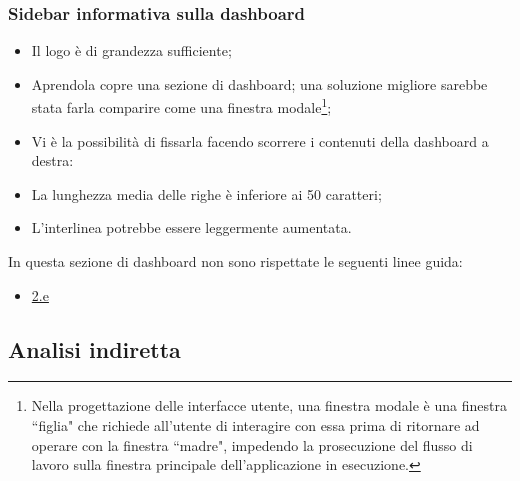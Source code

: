 \subsubsection{Sidebar informativa sulla dashboard}
\label{sss:sidebar-informativa-dashboard}
\begin{itemize}
    \item Il logo è di grandezza sufficiente;
    \item Aprendola copre una sezione di dashboard; una soluzione migliore sarebbe stata farla comparire come una finestra modale\footnote{Nella progettazione delle interfacce utente, una finestra modale è una finestra ``figlia" che richiede all'utente di interagire con essa prima di ritornare ad operare con la finestra ``madre", impedendo la prosecuzione del flusso di lavoro sulla finestra principale dell'applicazione in esecuzione.};
    \item Vi è la possibilità di fissarla facendo scorrere i contenuti della dashboard a destra:
    \item La lunghezza media delle righe è inferiore ai 50 caratteri;
    \item L'interlinea potrebbe essere leggermente aumentata.
\end{itemize}
In questa sezione di dashboard non sono rispettate le seguenti linee guida:
\begin{itemize}
    \item \hyperref[lg:2.e]{2.e}
\end{itemize}

\subsection{Analisi indiretta}
\label{ss:analisi-indiretta}
